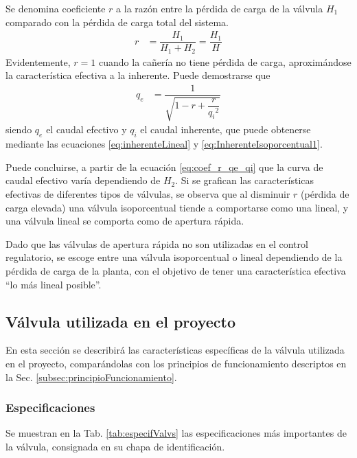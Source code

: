 Se denomina coeficiente $r$ a la razón entre la pérdida de carga de la válvula
$H_1$ comparado con la pérdida de carga total del sistema.
\begin{align}
 r &= \dfrac{H_1}{H_1+H_2} = \dfrac{H_1}{H}
\end{align}
Evidentemente, $r = 1$ cuando la cañería no tiene pérdida de carga,
aproximándose la característica efectiva a la inherente.
Puede demostrarse \cite{bib:Creus} que
\begin{align}
 q_e &= \dfrac{1}{\sqrt{1-r+\dfrac{r}{{q_i}^2}}}
 \label{eq:coef_r_qe_qi}
\end{align}
siendo $q_e$ el caudal efectivo y $q_i$ el caudal inherente, que puede
obtenerse mediante las ecuaciones \eqref{eq:inherenteLineal} y
\eqref{eq:InherenteIsoporcentual1}.

Puede concluirse, a partir de la ecuación \eqref{eq:coef_r_qe_qi} que la curva
de caudal efectivo varía dependiendo de $H_2$.
Si se grafican las características efectivas de diferentes tipos de válvulas,
se observa que al disminuir $r$ (pérdida de carga elevada) una válvula
isoporcentual tiende a comportarse como una lineal,
y una válvula lineal se comporta como de apertura rápida.

Dado que las válvulas de apertura rápida no son utilizadas en el control
regulatorio, se escoge entre una válvula isoporcentual o lineal dependiendo de
la pérdida de carga de la planta, con el objetivo de tener una característica
efectiva ``lo más lineal posible''.

\subsection{Válvula utilizada en el proyecto}

En esta sección se describirá las características específicas de la válvula
utilizada en el proyecto, comparándolas con los principios de funcionamiento
descriptos en la Sec. \ref{subsec:principioFuncionamiento}.

\subsubsection{Especificaciones}
Se muestran en la Tab. \ref{tab:especifValvs} las especificaciones más
importantes de la válvula, consignada en su chapa de identificación.


